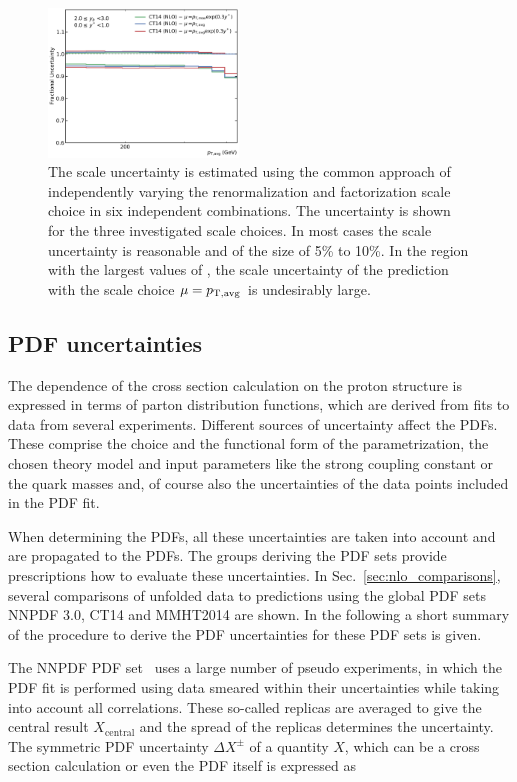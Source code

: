\begin{figure}[htp]
    \includegraphics[width=0.45\textwidth]{figures/theory/scale_uncert_comp_yb2ys0.pdf}
    \caption[Scale Uncertainties of NLO calculation]{The scale uncertainty is estimated using the common approach of
        independently varying the renormalization and factorization scale
        choice in six independent combinations. The uncertainty is shown for the
        three investigated scale choices. In most cases the scale uncertainty is
        reasonable and of the size of 5\% to 10\%. In the region with the
        largest values of \ystar, the scale uncertainty of the prediction with
    the scale choice $\mu=p_{\mathrm{T,avg}}$ is undesirably large.}
    \label{fig:scale_uncertainties}
\end{figure}

\subsection{PDF uncertainties}
\label{sec:pdf_uncertainties}

The dependence of the cross section calculation on the proton structure is
expressed in terms of parton distribution functions, which are derived from
fits to data from several experiments. Different sources of
uncertainty affect the PDFs. These comprise the choice and the
functional form of the parametrization, the chosen theory model and input
parameters like the strong coupling constant \as or the quark masses and, of
course also the uncertainties of the data points included in the PDF fit.

When determining the PDFs, all these uncertainties are taken into account and
are propagated to the PDFs. The groups deriving the PDF sets provide
prescriptions how to evaluate these uncertainties. In
Sec.~\ref{sec:nlo_comparisons}, several comparisons of unfolded data to predictions using the
global PDF sets NNPDF 3.0, CT14 and MMHT2014 are shown. In the following a short
summary of the procedure to derive the PDF uncertainties for these PDF sets is
given.

The NNPDF PDF set~\cite{Ball:2014uwa} uses a large number of pseudo experiments, in which the PDF
fit is performed using data smeared within their uncertainties while taking into
account all correlations. These so-called replicas are averaged to give the
central result $X_\mathrm{central}$ and the spread of the replicas determines the uncertainty. The
symmetric PDF uncertainty $\Delta X^\pm$ of a quantity $X$, which can be a cross section calculation or
even the PDF itself is expressed as

